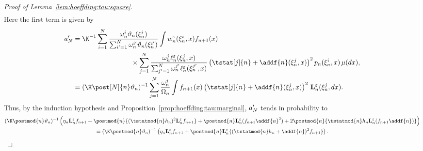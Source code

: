 \begin{proof}[Proof of Lemma~\ref{lem:hoeffding:tau:square}]
\begin{align*}
\end{align*}
Here the first term is given by
\begin{align}
a_\N' &= \K^{-1} \sum_{i = 1}^\N \frac{\ewght{n}{i}\adjfuncforward{n}(\epart{n}{i})}{\sum_{i' = 1}^{\N} \ewght{n}{i'} \adjfuncforward{n}(\epart{n}{i'})} \int \wgtfuncmod{n}(\epart{n}{i}, x) f_{n + 1}(x) \nonumber \\
&\hspace{3cm}\times \sum_{j = 1}^\N \frac{\ewght{n}{j} \udmod{n}(\epart{n}{j}, x)}{\sum_{j' = 1}^{\N} \ewght{n}{j'} \udmod{n}(\epart{n}{j'}, x)} \left(\tstat[j]{n} + \addf{n}(\epart{n}{j}, x) \right)^2  \kissforward{n}{n}(\epart{n}{i},x) \, \mu(\rmd x), \nonumber \\
&= (\K \post[\N]{n}\adjfuncforward{n})^{-1} \sum_{j = 1}^\N \frac{\ewght{n}{j}}{\sumwght{n}} \int f_{n + 1}(x) \left( \tstat[j]{n} + \addf{n}(\epart{n}{j}, x) \right)^2 \, \ukmod{n}(\epart{n}{j}, \rmd x). \label{eq:a':1}
\end{align}
Thus, by the induction hypothesis and Proposition~\ref{prop:hoeffding:tau:marginal}, $a_N'$ tends in probability to 
\begin{multline*}
(\K \postmod{n}\adjfuncforward{n})^{-1} \left(\eta_n \ukmod{n} f_{n + 1} + \postmod{n}\{(\tstatmod{n} h_n)^2 \ukmod{n} f_{n+1}\} + \postmod{n} \ukmod{n}(f_{n + 1} \addf{n}^2)  + 2 \postmod{n}\{\tstatmod{n} h_n \ukmod{n}(f_{n + 1} \addf{n})\} \right) \\
= (\K \postmod{n} \adjfuncforward{n})^{-1} \left(\eta_n \ukmod{n} f_{n + 1} + \postmod{n} \ukmod{n} \{(\tstatmod{n} h_n +\addf{n})^2 f_{n + 1} \} \right). 
\end{multline*}


\end{proof}
